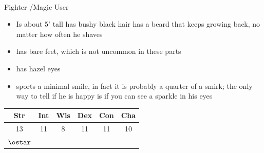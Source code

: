 \documentclass[11pt]{article}
\begin{document}
\begin{minipage}{0.55\textwidth}%
    \Huge{} \\
    \Large{Fighter \FighterLevel/Magic User \MagicUserLevel} \\
    \begin{normalsize}
        \begin{itemize}[topsep=0pt, itemsep=0pt, partopsep=0pt, parsep=0pt, leftmargin=*]
            \item Is about 5’ tall has bushy black hair has a beard that keeps growing back, no matter how often he shaves
            \item has bare feet, which is not uncommon in these parts
            \item has hazel eyes
            \item sports a minimal smile, in fact it is probably a quarter of a smirk; the only way to tell if he is happy is if you can see a sparkle in his eyes
        \end{itemize}
    \end{normalsize}
    \begin{large}
        \vspace{0.4cm}
        \begin{tabular}{cccccc}
            Str & Int & Wis & Dex & Con & Cha \\ \hline
            13 & 11 & 8 & 11 & 11 & 10\\ 
            $\ostar$ & & & & & 
        \end{tabular}
    \end{large}
    \vspace{0.4cm}


\end{minipage}
\end{document}
